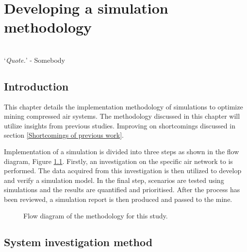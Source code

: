 \chapter{Developing a simulation methodology}
\thispagestyle{empty}
\vspace{38em}
\hrulefill
\\
\enquote*{\textit{Quote.}} - Somebody\\
\newpage
\section{Introduction}
This chapter details the implementation methodology of simulations to optimize mining compressed air systems. The methodology discussed in this chapter will utilize insights from previous studies. Improving on shortcomings discussed in section \ref{Shortcomings of previous work}.
\par 
Implementation of a simulation is divided into three steps as shown in the flow diagram, Figure \ref{fig: Methodology}. Firstly, an investigation on the specific air network to is performed. The data acquired from this investigation is then utilized to develop and verify a simulation model. In the final step, scenarios are tested using simulations and the results are quantified and prioritised. After the process has been reviewed, a simulation  report is then produced and passed to the mine.
\begin{figure}[h]
	\centering
	\caption{Flow diagram of the methodology for this study.}
	\label{fig: Methodology}
\end{figure}

\section{System investigation method}
